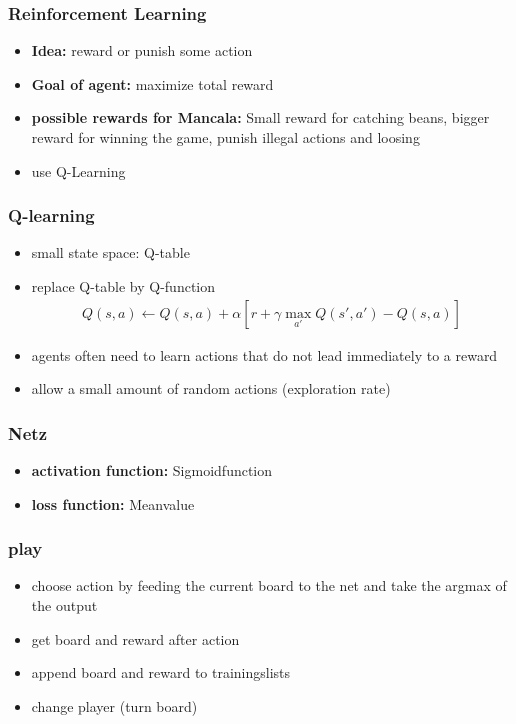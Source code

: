 \documentclass{beamer}
\begin{document}
 \begin{frame}
 \frametitle{Reinforcement Learning}
 \begin{itemize}
 \item \textbf{Idea:} reward or punish some action
 \item \textbf{Goal of agent:} maximize total reward
 \item \textbf{possible rewards for Mancala:} Small reward for catching beans, bigger reward for winning the game, punish illegal actions and loosing
 \item use Q-Learning
 \end{itemize}
 \end{frame}
 
  \begin{frame}
  \frametitle{Q-learning}
 \begin{itemize}
 \item small state space: Q-table
  \item replace Q-table by Q-function 
  \begin{align}
  Q(s,a) \leftarrow Q(s,a)+\alpha [r+\gamma \max_{a'} Q(s',a') -Q(s,a)]
  \end{align}
 \item agents often need to learn actions that do not lead immediately to a reward
 \item allow a small amount of random actions (exploration rate)
 \end{itemize}
 \end{frame}
 
  \begin{frame}
 \frametitle{Netz}
\begin{itemize}
\item \textbf{activation function:} Sigmoidfunction
\item \textbf{loss function:} Meanvalue
\end{itemize}
 \end{frame}

  \begin{frame}
 \frametitle{play}
 \begin{itemize}
\item choose action by feeding the current board to the net and take the argmax of the output
\item get board and reward after action 
\item append board and reward to trainingslists
\item change player (turn board)
\end{itemize}
\end{frame}
 
\end{document}
